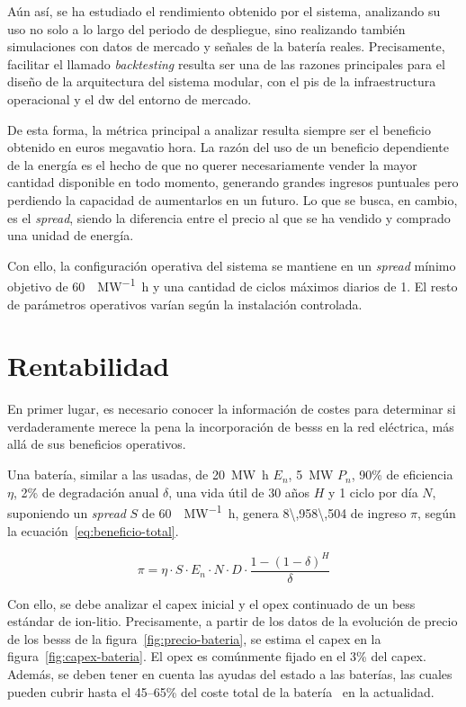 Aún así, se ha estudiado el rendimiento obtenido por el sistema, analizando su uso no solo a lo largo del periodo de despliegue, sino realizando también simulaciones con datos de mercado y señales de la batería reales. Precisamente, facilitar el llamado \textit{backtesting} resulta ser una de las razones principales para el diseño de la arquitectura del sistema modular, con el \gls{pis} de la infraestructura operacional y el \gls{dw} del entorno de mercado.

De esta forma, la métrica principal a analizar resulta siempre ser el beneficio obtenido en euros megavatio hora. La razón del uso de un beneficio dependiente de la energía es el hecho de que no querer necesariamente vender la mayor cantidad disponible en todo momento, generando grandes ingresos puntuales pero perdiendo la capacidad de aumentarlos en un futuro. Lo que se busca, en cambio, es el \textit{spread}, siendo la diferencia entre el precio al que se ha vendido y comprado una unidad de energía.

Con ello, la configuración operativa del sistema se mantiene en un \textit{spread} mínimo objetivo de \SI{60}{\text{\euro}\per\mega\watt\hour} y una cantidad de ciclos máximos diarios de 1. El resto de parámetros operativos varían según la instalación controlada.

\section{Rentabilidad}
\label{makereference7.1}

En primer lugar, es necesario conocer la información de costes para determinar si verdaderamente merece la pena la incorporación de \glspl{bess} en la red eléctrica, más allá de sus beneficios operativos.

Una batería, similar a las usadas, de \SI{20}{\mega\watt\hour} \( E_{n} \), \SI{5}{\mega\watt} \( P_{n} \), 90\% de eficiencia \( \eta \), 2\% de degradación anual \( \delta \), una vida útil de 30 años \( H \) y 1 ciclo por día \( N \), suponiendo un \textit{spread} \( S \) de \SI{60}{\text{\euro}\per\mega\watt\hour}, genera \SI{8\,958\,504}{\text{\euro}} de ingreso \( \pi \), según la ecuación~\ref{eq:beneficio-total}.

\begin{equation}
  \label{eq:beneficio-total}
  \pi = \eta \cdot S \cdot E_{n} \cdot N \cdot D \cdot \frac{1 - (1 - \delta)^{H}}{\delta}
\end{equation}

Con ello, se debe analizar el \gls{capex} inicial y el \gls{opex} continuado de un \gls{bess} estándar de ion-litio. Precisamente, a partir de los datos de la evolución de precio de los \glspl{bess} de la figura~\ref{fig:precio-bateria}, se estima el \gls{capex} en la figura~\ref{fig:capex-bateria}. El \gls{opex} es comúnmente fijado en el 3\% del \gls{capex}. Además, se deben tener en cuenta las ayudas del estado a las baterías, las cuales pueden cubrir hasta el 45--65\% del coste total de la batería~\cite{solfy2025subvenciones} en la actualidad.

